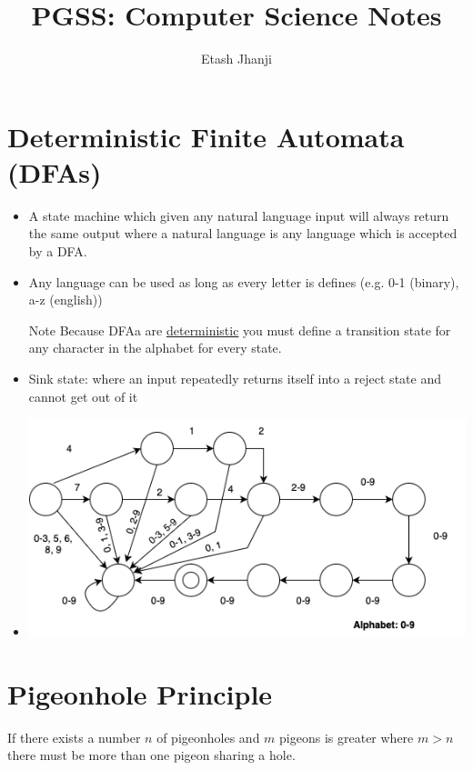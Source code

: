 \documentclass[12pt,letterpaper, twocolumn]{article}
\author{Etash Jhanji}
\title{PGSS: Computer Science Notes}
\date{}
\begin{document}
\maketitle


\section{Deterministic Finite Automata (DFAs)}

\begin{itemize}
    \item A state machine which given any natural language input will always return the same output where a natural language is any language which is accepted by a DFA.
    \item Any language can be used as long as every letter is defines (e.g. 0-1 (binary), a-z (english))
    \item[Note] Because DFAa are \underline{deterministic} you must define a transition state for any character in the alphabet for every state. 
    \item Sink state: where an input repeatedly returns itself into a reject state and cannot get out of it
    \item \begin{center}\includegraphics*[width=0.85\columnwidth]{DFA_phone.png}\end{center}
\end{itemize}

\section{Pigeonhole Principle}
If there exists a number $n$ of pigeonholes and $m$ pigeons is greater where $m>n$ there must be more than one pigeon sharing a hole. 
\end{document}
